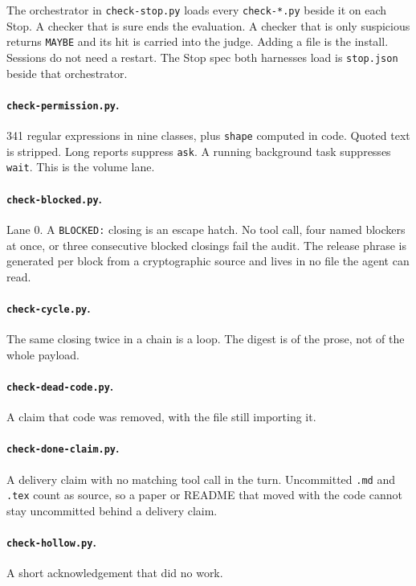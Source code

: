 The orchestrator in \texttt{check-stop.py} loads every
\texttt{check-*.py} beside it on each Stop. A checker that is sure
ends the evaluation. A checker that is only suspicious returns
\texttt{MAYBE} and its hit is carried into the judge. Adding a file
is the install. Sessions do not need a restart. The Stop spec both
harnesses load is \texttt{stop.json} beside that orchestrator.

\paragraph{\texttt{check-permission.py}.}
341 regular expressions in nine classes, plus \texttt{shape}
computed in code. Quoted text is stripped. Long reports suppress
\texttt{ask}. A running background task suppresses \texttt{wait}.
This is the volume lane.

\paragraph{\texttt{check-blocked.py}.}
Lane 0. A \texttt{BLOCKED:} closing is an escape hatch. No tool
call, four named blockers at once, or three consecutive blocked
closings fail the audit. The release phrase is generated per block
from a cryptographic source and lives in no file the agent can
read.

\paragraph{\texttt{check-cycle.py}.}
The same closing twice in a chain is a loop. The digest is of the
prose, not of the whole payload.

\paragraph{\texttt{check-dead-code.py}.}
A claim that code was removed, with the file still importing it.

\paragraph{\texttt{check-done-claim.py}.}
A delivery claim with no matching tool call in the turn.
Uncommitted \texttt{.md} and \texttt{.tex} count as source, so a
paper or README that moved with the code cannot stay uncommitted
behind a delivery claim.

\paragraph{\texttt{check-hollow.py}.}
A short acknowledgement that did no work.

